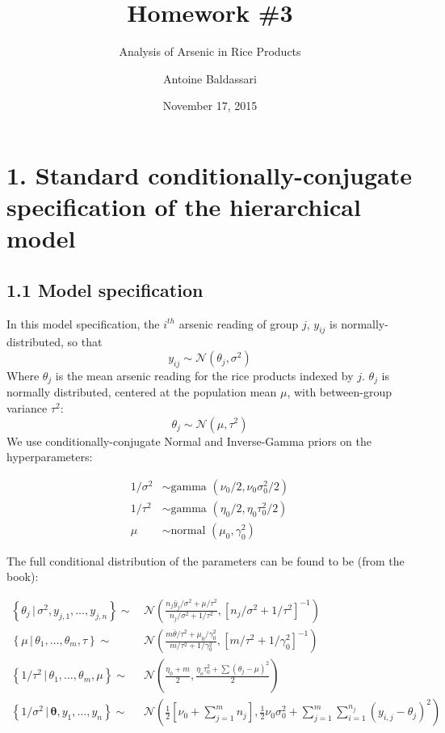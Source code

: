 \documentclass[]{article}
\title{Homework \#3}
\subtitle{Analysis of Arsenic in Rice Products}
\author{Antoine Baldassari}
\date{November 17, 2015}
\begin{document}
\maketitle


\section{1. Standard conditionally-conjugate specification of the hierarchical model}\subsection{1.1 Model specification}

In this model specification, the \(i^{th}\) arsenic reading of group
\(j\), \(y_{ij}\) is normally-distributed, so that
\[y_{ij} \sim \mathcal{N}\left( \theta_j, \sigma^2 \right)\] Where
\(\theta_j\) is the mean arsenic reading for the rice products indexed
by \(j\). \(\theta_j\) is normally distributed, centered at the
population mean \(\mu\), with between-group variance \(\tau^2\):
\[\theta_j \sim \mathcal{N}\left( \mu, \tau^2 \right) \] We use
conditionally-conjugate Normal and Inverse-Gamma priors on the
hyperparameters:

\begin{align*}
        1/\sigma^2 & \sim \text{gamma }(\nu_0/2, \nu_0\sigma^2_0/2)\\
        1/\tau^2 & \sim \text{gamma }(\eta_0/2,\eta_0\tau_0^2/2)\\
        \mu & \sim \text{normal }(\mu_0, \gamma_0^2)
    \end{align*}

The full conditional distribution of the parameters can be found to be
(from the book):

\begin{align*}
        \left\{ \theta_j \, | \, \sigma^2, y_{j,1},\ldots,y_{j,n} \right\} \sim& \, \mathcal{N}\left( \frac{n_j\bar{y}_j/\sigma^2+\mu/\tau^2}{n_j/\sigma^2 + 1/\tau^2}, \left[ n_j/\sigma^2+1/\tau^2\right]^{-1} \right) \\
        \left\{\mu \, | \, \theta_1,\ldots,\theta_m,\tau \right\} \sim& \, \mathcal{N} \left( \frac{m\bar{\theta}/\tau^2 + \mu_0/\gamma_0^2}{m/\tau^2+1/\gamma_0^2},\left[ m/\tau^2 + 1/\gamma_0^2\right]^{-1} \right)\\
        \left\{ 1/\tau^2 \, | \, \theta_1, \ldots, \theta_m, \mu \right\} \sim& \, \mathcal{N}\left( \frac{\eta_0 +m}{2},\frac{\eta_o\tau^2_0+\sum\left(\theta_j -\mu \right)^2}{2} \right) \\
        \left\{1/\sigma^2 \, | \, \boldsymbol{\theta}, y_1, \ldots, y_n \right\} \sim& \, \mathcal{N}\left( \frac{1}{2}\left[ \nu_0 + \sum\limits_{j=1}^m n_j \right], \frac{1}{2}\nu_0\sigma_0^2 + \sum\limits_{j=1}^m \sum\limits_{i=1}^{n_j} \left(y_{i,j} -\theta_j \right)^2 \right)
    \end{align*}
\end{document}
